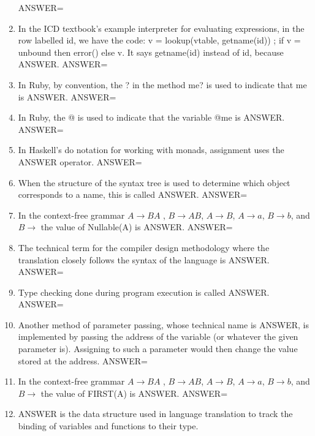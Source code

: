 \documentclass{exam}
\begin{document}
\begin{enumerate}
ANSWER=
\item In the ICD textbook's example interpreter for evaluating expressions, in the row labelled id, we have the code: v = lookup(vtable, getname(id)) ; if v = unbound then error() else v.  It says getname(id) instead of id, because ANSWER.\newline
ANSWER=
\item In Ruby, by convention, the ? in the method me? is used to indicate that me is ANSWER.\newline
ANSWER=
\item In Ruby, the @ is used to indicate that the variable @me is ANSWER.\newline
ANSWER=
\item In Haskell's do notation for working with monads, assignment uses the ANSWER operator.\newline
ANSWER=
\item When the structure of the syntax tree is used to determine which object corresponds to a name, this is called ANSWER.\newline
ANSWER=
\item In the context-free grammar $A \rightarrow B A$ , $B \rightarrow A B$, $A \rightarrow B$, $A \rightarrow a$, $B \rightarrow b$, and $B \rightarrow$  the value of Nullable(A) is ANSWER.\newline
ANSWER=
\item The technical term for the compiler design methodology where the translation closely follows the syntax of the language is ANSWER.\newline
ANSWER=
\item Type checking done during program execution is called ANSWER.\newline
ANSWER=
\item Another method of parameter passing, whose technical name is ANSWER, is implemented by passing the address of the variable (or whatever the given parameter is).  Assigning to such a parameter would then change the value stored at the address.\newline
ANSWER=
\item In the context-free grammar $A \rightarrow B A$ , $B \rightarrow A B$, $A \rightarrow B$, $A \rightarrow a$, $B \rightarrow b$, and $B \rightarrow$  the value of FIRST(A) is ANSWER.\newline
ANSWER=
\item ANSWER is the data structure used in language translation to track the binding of variables and functions to their type.\newline

\end{enumerate}
\end{document}
